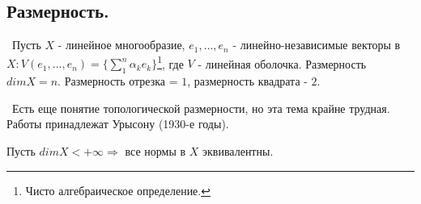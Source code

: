 \subsection*{Размерность.}

\noindent \textasteriskcentered~Пусть $X$ - линейное многообразие, $e_1, \dots, e_n$ - линейно-независимые векторы в $X : V(e_1, \dots, e_n) = \{ \sum_1^n 
\alpha_k e_k\}$\footnote{Чисто алгебраическое определение.}, где $V$ - линейная оболочка. Размерность $dim X = n$. Размерность отрезка = $1$, размерность квадрата - $2$.

\medskip
\noindent \checkmark~Есть еще понятие топологической размерности, но эта тема крайне трудная. Работы принадлежат Урысону (1930-е годы).

\bigskip
\begin{theorem*}
Пусть $dim X < +\infty \Rightarrow$ все нормы в $X$ эквивалентны.
\end{theorem*}

